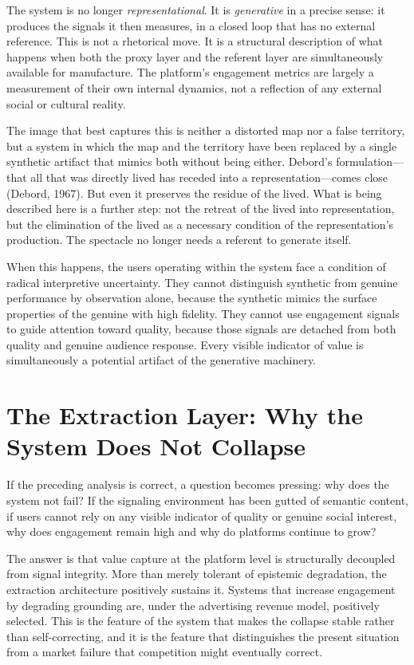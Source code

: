 \documentclass[12pt, a4paper]{article}
\begin{document}
The system is no longer \textit{representational}. It is \textit{generative} in a precise sense: it produces the signals it then measures, in a closed loop that has no external reference. This is not a rhetorical move. It is a structural description of what happens when both the proxy layer and the referent layer are simultaneously available for manufacture. The platform's engagement metrics are largely a measurement of their own internal dynamics, not a reflection of any external social or cultural reality.

The image that best captures this is neither a distorted map nor a false territory, but a system in which the map and the territory have been replaced by a single synthetic artifact that mimics both without being either. Debord's formulation---that all that was directly lived has receded into a representation---comes close (Debord, 1967). But even it preserves the residue of the lived. What is being described here is a further step: not the retreat of the lived into representation, but the elimination of the lived as a necessary condition of the representation's production. The spectacle no longer needs a referent to generate itself.

When this happens, the users operating within the system face a condition of radical interpretive uncertainty. They cannot distinguish synthetic from genuine performance by observation alone, because the synthetic mimics the surface properties of the genuine with high fidelity. They cannot use engagement signals to guide attention toward quality, because those signals are detached from both quality and genuine audience response. Every visible indicator of value is simultaneously a potential artifact of the generative machinery.

\section{The Extraction Layer: Why the System Does Not Collapse}

If the preceding analysis is correct, a question becomes pressing: why does the system not fail? If the signaling environment has been gutted of semantic content, if users cannot rely on any visible indicator of quality or genuine social interest, why does engagement remain high and why do platforms continue to grow?

The answer is that value capture at the platform level is structurally decoupled from signal integrity. More than merely tolerant of epistemic degradation, the extraction architecture positively sustains it. Systems that increase engagement by degrading grounding are, under the advertising revenue model, positively selected. This is the feature of the system that makes the collapse stable rather than self-correcting, and it is the feature that distinguishes the present situation from a market failure that competition might eventually correct.
\end{document}
